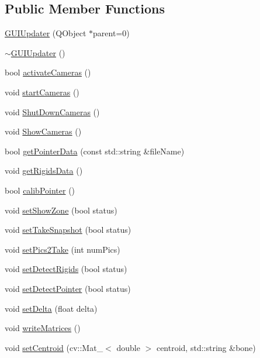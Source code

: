\subsection*{Public Member Functions}
\begin{DoxyCompactItemize}
\item 
\hyperlink{class_g_u_i_updater_aead8933227b7b7cc78e23b98d6c80ab1}{G\+U\+I\+Updater} (Q\+Object $\ast$parent=0)
\item 
\hyperlink{class_g_u_i_updater_aabcc67dca68b515f3a86caab5f347b8e}{$\sim$\+G\+U\+I\+Updater} ()
\item 
bool \hyperlink{class_g_u_i_updater_af392547bf970784b35f47118512edb0e}{activate\+Cameras} ()
\item 
void \hyperlink{class_g_u_i_updater_a965d3cc548ceb3bfad4dd3be8ddd4e54}{start\+Cameras} ()
\item 
void \hyperlink{class_g_u_i_updater_ae51c4254189ed802733dcf6922851426}{Shut\+Down\+Cameras} ()
\item 
void \hyperlink{class_g_u_i_updater_acf45c3f51346a40e94988d2544650d3b}{Show\+Cameras} ()
\item 
bool \hyperlink{class_g_u_i_updater_abfd0c6a214ab802eaa64e689010cdfeb}{get\+Pointer\+Data} (const std\+::string \&file\+Name)
\item 
void \hyperlink{class_g_u_i_updater_a677be84d397c616cb70d011b127406a5}{get\+Rigids\+Data} ()
\item 
bool \hyperlink{class_g_u_i_updater_abed450cacbd127705c14f797a5c1470d}{calib\+Pointer} ()
\item 
void \hyperlink{class_g_u_i_updater_a978e2b67abc8c081b61a7b0956bcabe4}{set\+Show\+Zone} (bool status)
\item 
void \hyperlink{class_g_u_i_updater_aa0677943be1e52a2852295384034fcd9}{set\+Take\+Snapshot} (bool status)
\item 
void \hyperlink{class_g_u_i_updater_a0646d9ce35c4fdcfc3ffa99c2b795bbe}{set\+Pics2\+Take} (int num\+Pics)
\item 
void \hyperlink{class_g_u_i_updater_ae5ce3b5dc00512e178cd7d7b16596463}{set\+Detect\+Rigids} (bool status)
\item 
void \hyperlink{class_g_u_i_updater_aa938ec821b9be8d1cd953fb0f9cbde5f}{set\+Detect\+Pointer} (bool status)
\item 
void \hyperlink{class_g_u_i_updater_af5e61de316d9cb02a61944319e25f6d1}{set\+Delta} (float delta)
\item 
void \hyperlink{class_g_u_i_updater_a8d47fbed8c4e041cbc91c2e868000e4e}{write\+Matrices} ()
\item 
void \hyperlink{class_g_u_i_updater_ae716caa2ecd78c5fa939f9cb34a0bc48}{set\+Centroid} (cv\+::\+Mat\+\_\+$<$ double $>$ centroid, std\+::string \&bone)
\end{DoxyCompactItemize}


